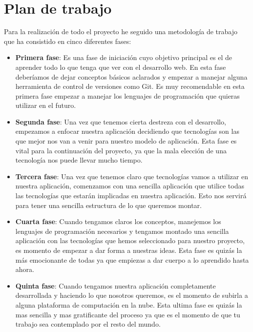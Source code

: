 \section{Plan de trabajo}

Para la realización de todo el proyecto he seguido una metodología de trabajo que ha consistido en cinco diferentes fases:

\begin{itemize}

\item \textbf {Primera fase}: Es una fase de iniciación cuyo objetivo principal es el de aprender todo lo que tenga que ver con el desarrollo web. En esta fase deberíamos de dejar conceptos básicos aclarados y empezar a manejar alguna herramienta de control de versiones como Git. Es muy recomendable en esta primera fase empezar a manejar los lenguajes de programación que quieras utilizar en el futuro.

\item \textbf {Segunda fase}: Una vez que tenemos cierta destreza con el desarrollo, empezamos a enfocar nuestra aplicación decidiendo que tecnologías son las que mejor nos van a venir para nuestro modelo de aplicación. Esta fase es vital para la continuación del proyecto, ya que la mala elección de una tecnología nos puede llevar mucho tiempo.

\item \textbf {Tercera fase}: Una vez que tenemos claro que tecnologías vamos a utilizar en nuestra aplicación, comenzamos con una sencilla aplicación que utilice todas las tecnologías que estarán implicadas en nuestra aplicación. Esto nos servirá para tener una sencilla estructura de lo que queremos montar.

\item \textbf {Cuarta fase}: Cuando tengamos claros los conceptos, manejemos los lenguajes de programación necesarios y tengamos montado una sencilla aplicación con las tecnologías que hemos seleccionado para nuestro proyecto, es momento de empezar a dar forma a nuestras ideas. Esta fase es quizás la más emocionante de todas ya que empiezas a dar cuerpo a lo aprendido hasta ahora.

\item \textbf {Quinta fase}: Cuando tengamos nuestra aplicación completamente desarrollada y haciendo lo que nosotros queremos, es el momento de subirla a alguna plataforma de computación en la nube. Esta ultima fase es quizás la mas sencilla y mas gratificante del proceso ya que es el momento de que tu trabajo sea contemplado por el resto del mundo.

\end{itemize}
